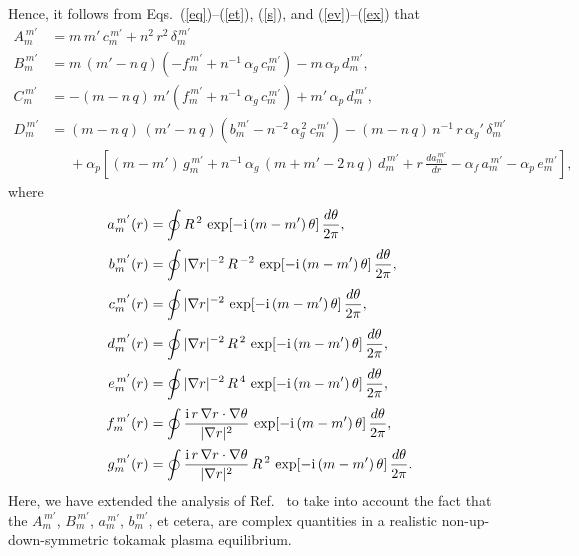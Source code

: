 \documentclass[12pt,prb,aps]{revtex4-1}
\begin{document}
Hence, it follows from Eqs.~(\ref{eq})--(\ref{et}), (\ref{s}), and (\ref{ev})--(\ref{ex}) that\,\cite{am3}
\begin{align}\label{e104}
A_m^{\,m'}&= m\,m'\,c_m^{\,m'} + n^2\,r^2\,\delta_m^{\,m'}\\[0.5ex]
B_m^{\,m'}&= m\,(m'-n\,q)\left(-f_m^{\,m'}+n^{-1}\,\alpha_g\,c_m^{\,m'}\right) -m\,\alpha_p\,d_m^{\,m'},\\[0.5ex]
C_m^{\,m'}&= -(m-n\,q)\,m'\left(f_m^{\,m'}+n^{-1}\,\alpha_g\,c_m^{\,m'}\right)+m'\,\alpha_p\,d_m^{\,m'},\\[0.5ex]
D_m^{\,m'}&= (m-n\,q)\,(m'-n\,q)\left(b_m^{\,m'}-n^{-2}\,\alpha_g^{\,2}\,c_m^{\,m'}\right) - (m-n\,q)\,n^{-1}\,r\,\alpha_g'\,\delta_m^{\,m'}\label{e107}\\[0.5ex]
&\phantom{=} + 
\alpha_p\left[(m-m')\,g_m^{\,m'}+n^{-1}\,\alpha_g\,(m+m'-2\,n\,q)\,d_m^{\,m'} + r\,\frac{d a_m^{\,m'}}{dr}-\alpha_f\,a_m^{\,m'}
-\alpha_p\,e_m^{\,m'}\right],\nonumber
\end{align}
where
\begin{align}\label{e108}
a_m^{\,m'}(r) &= \oint R^{\,2}\,\exp[-{\rm i}\,(m-m')\,\theta]\,\frac{d\theta}{2\pi},\\[0.5ex]
b_m^{\,m'}(r) &= \oint |\nabla r|^{-2}\,R^{\,-2}\,\exp[-{\rm i}\,(m-m')\,\theta]\,\frac{d\theta}{2\pi},\\[0.5ex]
c_m^{\,m'}(r) &= \oint |\nabla r|^{-2}\,\exp[-{\rm i}\,(m-m')\,\theta]\,\frac{d\theta}{2\pi},\\[0.5ex]
d_m^{\,m'}(r) &= \oint |\nabla r|^{-2}\,R^{\,2}\,\exp[-{\rm i}\,(m-m')\,\theta]\,\frac{d\theta}{2\pi},\\[0.5ex]
e_m^{\,m'}(r) &= \oint |\nabla r|^{-2}\,R^{\,4}\,\exp[-{\rm i}\,(m-m')\,\theta]\,\frac{d\theta}{2\pi},\\[0.5ex]
f_m^{\,m'}(r) &= \oint \frac{{\rm i}\,r\,\nabla r\cdot\nabla\theta}{|\nabla r|^2}\,\exp[-{\rm i}\,(m-m')\,\theta]\,\frac{d\theta}{2\pi},\label{fdef}\\[0.5ex]
g_m^{\,m'}(r) &= \oint \frac{{\rm i}\,r\,\nabla r\cdot\nabla\theta}{|\nabla r|^2}\,R^{\,2}\,\exp[-{\rm i}\,(m-m')\,\theta]\,\frac{d\theta}{2\pi}.\label{e114}
\end{align}
Here, we have extended the analysis of Ref.~ to take into account the fact that the $A_m^{\,m'}$, $B_m^{\,m'}$, $a_m^{\,m'}$, $b_m^{\,m'}$, et cetera,
are complex quantities in a realistic non-up-down-symmetric tokamak plasma equilibrium. 
\end{document}

